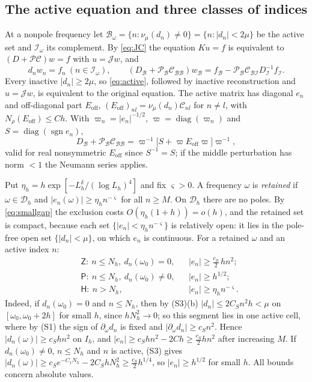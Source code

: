 \documentclass[11pt]{amsart}
\numberwithin{equation}{section}
\theoremstyle{definition}
\theoremstyle{remark}
\newcommand{\abs}[1]{\lvert #1\rvert}
\newcommand{\sgn}{\operatorname{sgn}}
\newcommand{\cP}{\mathcal P}
\newcommand{\cJ}{\mathcal J}
\newcommand{\cC}{\mathcal C}
\newcommand{\Dh}{\mathcal D_h}
\begin{document}
\subsection{The active equation and three classes of indices}
At a nonpole frequency let $\mathcal B_\omega=\{n:\nu_\mu(d_n)\ne0\}=\{n:\abs{d_n}<2\mu\}$ be the active set and $\mathcal I_\omega$ its complement. By \eqref{eq:JC} the equation $Ku=f$ is equivalent to $(D+\cP\cC)w=f$ with $u=\cJ w$, and
\begin{equation}\label{eq:active}
d_nw_n=f_n\ (n\in\mathcal I_\omega),\qquad(D_{\mathcal B}+\cP_{\mathcal B}\cC_{\mathcal B\mathcal B})w_{\mathcal B}=f_{\mathcal B}-\cP_{\mathcal B}\cC_{\mathcal B\mathcal I}D_{\mathcal I}^{-1}f_{\mathcal I}.
\end{equation}
Every inactive $\abs{d_n}\ge2\mu$, so \eqref{eq:active}, followed by inactive reconstruction and $u=\cJ w$, is equivalent to the original equation. The active matrix has diagonal $e_n$ and off-diagonal part $E_{\mathrm{off}}$, $(E_{\mathrm{off}})_{nl}=\nu_\mu(d_n)\cC_{nl}$ for $n\ne l$, with $N_\rho(E_{\mathrm{off}})\le Ch$. With $\varpi_n=\abs{e_n}^{-1/2}$, $\varpi=\operatorname{diag}(\varpi_n)$ and $S=\operatorname{diag}(\sgn e_n)$,
\begin{equation}\label{eq:middle}
D_{\mathcal B}+\cP_{\mathcal B}\cC_{\mathcal B\mathcal B}=\varpi^{-1}\bigl[S+\varpi E_{\mathrm{off}}\varpi\bigr]\varpi^{-1},
\end{equation}
valid for real nonsymmetric $E_{\mathrm{off}}$ since $S^{-1}=S$; if the middle perturbation has norm $<1$ the Neumann series applies.

Put $\eta_h=h\exp[-L_h^\delta/(\log L_h)^4]$ and fix $\varsigma>0$. A frequency $\omega$ is \emph{retained} if $\omega\in\Dh$ and $\abs{e_n(\omega)}\ge\eta_hn^{-\varsigma}$ for all $n\ge M$. On $\Dh$ there are no poles. By \eqref{eq:smallgap} the exclusion costs $O(\eta_h(1+h))=o(h)$, and the retained set is compact, because each set $\{\abs{e_n}<\eta_hn^{-\varsigma}\}$ is relatively open: it lies in the pole-free open set $\{\abs{d_n}<\mu\}$, on which $e_n$ is continuous. For a retained $\omega$ and an active index $n$:
\begin{equation}\label{eq:classes}
\begin{aligned}
&\mathsf Z:\ n\le N_h,\ d_n(\omega_0)=0,&&\abs{e_n}\ge\tfrac{c_S}2\,hn^2;\\
&\mathsf P:\ n\le N_h,\ d_n(\omega_0)\ne0,&&\abs{e_n}\ge h^{1/2};\\
&\mathsf H:\ n>N_h,&&\abs{e_n}\ge\eta_hn^{-\varsigma}.
\end{aligned}
\end{equation}
Indeed, if $d_n(\omega_0)=0$ and $n\le N_h$, then by (S3)(b) $\abs{d_n}\le2C_Sn^2h<\mu$ on $[\omega_0,\omega_0+2h]$ for small $h$, since $hN_h^2\to0$; so this segment lies in one active cell, where by (S1) the sign of $\partial_\omega d_n$ is fixed and $\abs{\partial_\omega d_n}\ge c_Sn^2$. Hence $\abs{d_n(\omega)}\ge c_Shn^2$ on $I_h$, and $\abs{e_n}\ge c_Shn^2-2Ch\ge\frac{c_S}2hn^2$ after increasing $M$. If $d_n(\omega_0)\ne0$, $n\le N_h$ and $n$ is active, (S3) gives $\abs{d_n(\omega)}\ge c_Se^{-C_1N_h}-2C_ShN_h^2\ge\frac{c_S}2h^{1/4}$, so $\abs{e_n}\ge h^{1/2}$ for small $h$. All bounds concern absolute values.
\end{document}
